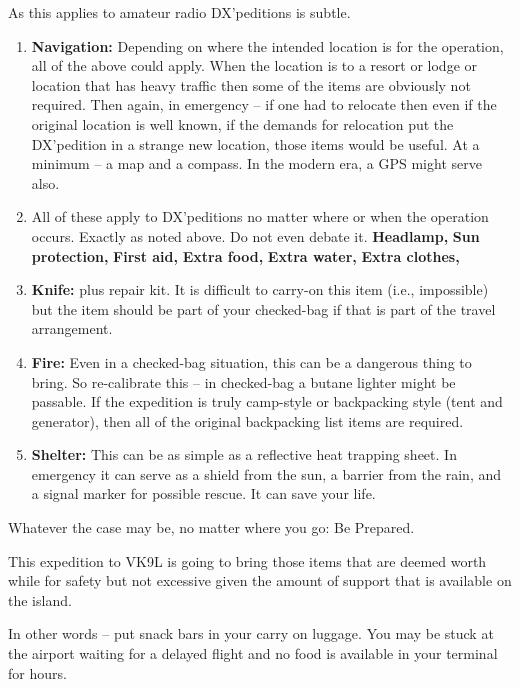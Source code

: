 {\par
As this applies to amateur radio DX'peditions is subtle.
\par
\begin{enumerate}
\item {\textbf{Navigation:}} Depending on where the intended location is
for the operation, all of the above could apply.   When the location
is to a resort or lodge or location that has heavy traffic then some of
the items are obviously not required.   Then again, in emergency -- if 
one had to relocate then even if the original location is well known, if the
demands for relocation put the DX'pedition in a strange new location, those
items would be useful.   At a minimum -- a map and a compass.  In the modern
era, a GPS might serve also.
\item All of these apply to DX'peditions no matter
where or when the operation occurs.  Exactly as noted above. Do not even debate it.
{\textbf{Headlamp,}}
{\textbf{Sun protection,}}
{\textbf{First aid,}} 
{\textbf{Extra food,}} 
{\textbf{Extra water,}} 
{\textbf{Extra clothes,}} 
\item {\textbf{Knife:}} plus repair kit.  It is difficult to carry-on this
item (i.e., impossible) but the item should be part of your checked-bag if
that is part of the travel arrangement.
\item {\textbf{Fire:}} Even in a checked-bag situation, this can be
a dangerous thing to bring.  So re-calibrate this -- in checked-bag
a butane lighter might be passable.  If the expedition is truly camp-style
or backpacking style (tent and generator), then all of the original backpacking
list items are required.
\item {\textbf{Shelter:}} This can be as simple as a reflective heat trapping
sheet.  In emergency it can serve as a shield from the sun, a barrier from
the rain, and a signal marker for possible rescue.  It can save your life.
\end{enumerate}
\par
Whatever the case may be, no matter where you go:  Be Prepared.
\par
This expedition to VK9L is going to bring those items that are deemed
worth while for safety but not excessive given the amount of
support that is available on the island.
\par
In other words -- put snack bars in your carry on luggage.  You may be 
stuck at the airport waiting for a delayed flight and no food is available
in your terminal for hours.
}

